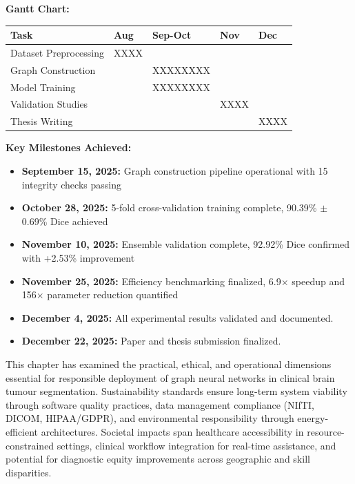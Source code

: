 \textbf{Gantt Chart:}

\begin{center}
\begin{tabularx}{\textwidth} { 
  | >{\raggedright\arraybackslash}X 
  | >{\centering\arraybackslash}X 
  | >{\centering\arraybackslash}X 
  | >{\centering\arraybackslash}X 
  | >{\centering\arraybackslash}X 
  | }
\hline
\textbf{Task} & \textbf{Aug} & \textbf{Sep-Oct} & \textbf{Nov} & \textbf{Dec}\\
\hline
Dataset Preprocessing & \cellcolor{gray!30}XXXX & & &\\
\hline
Graph Construction & & \cellcolor{gray!30}XXXXXXXX & &\\
\hline
Model Training & & \cellcolor{gray!30}XXXXXXXX & &\\
\hline
Validation Studies & & & \cellcolor{gray!30}XXXX &\\
\hline
Thesis Writing & & & & \cellcolor{gray!30}XXXX\\
\hline
\end{tabularx}
\end{center}

\textbf{Key Milestones Achieved:}
\begin{itemize}
    \item \textbf{September 15, 2025:} Graph construction pipeline operational with 15 integrity checks passing
    \item \textbf{October 28, 2025:} 5-fold cross-validation training complete, 90.39\% $\pm$ 0.69\% Dice achieved
    \item \textbf{November 10, 2025:} Ensemble validation complete, 92.92\% Dice confirmed with +2.53\% improvement
    \item \textbf{November 25, 2025:} Efficiency benchmarking finalized, 6.9$\times$ speedup and 156$\times$ parameter reduction quantified
    \item \textbf{December 4, 2025:} All experimental results validated and documented.
    \item \textbf{December 22, 2025:} Paper and thesis submission finalized.
\end{itemize}

\vspace{5mm}

This chapter has examined the practical, ethical, and operational dimensions essential for responsible deployment of graph neural networks in clinical brain tumour segmentation. Sustainability standards ensure long-term system viability through software quality practices, data management compliance (NIfTI, DICOM, HIPAA/GDPR), and environmental responsibility through energy-efficient architectures. Societal impacts span healthcare accessibility in resource-constrained settings, clinical workflow integration for real-time assistance, and potential for diagnostic equity improvements across geographic and skill disparities.


